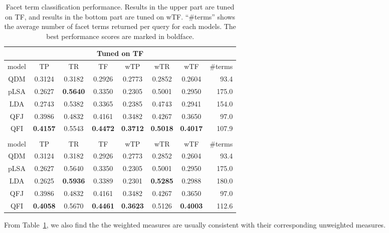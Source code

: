 \begin{table}[ht!]
\centering
\caption{Facet term classification performance. Results in the upper part are tuned on TF, and results in the bottom part are tuned on wTF. ``\#terms'' shows the average number of facet terms returned per query for each models. The best performance scores are marked in boldface.}
\label{tab:intrinsic-tf}
\begin{tabular}{|c|c|c|c|c|c|c|r|} \hline
\multicolumn{8}{|c|}{Tuned on TF} \\\hline
model& TP & TR & TF & wTP & wTR & wTF & \#terms \\ \hline
QDM & 0.3124 & 0.3182 & 0.2926 & 0.2773 & 0.2852 & 0.2604 & 93.4 \\\hline
pLSA & 0.2627 & \textbf{0.5640} & 0.3350 & 0.2305 & 0.5001 & 0.2950 & 175.0 \\ \hline
LDA & 0.2743 & 0.5382 & 0.3365 & 0.2385 & 0.4743 & 0.2941 & 154.0 \\ \hline
QFJ & 0.3986 & 0.4832 & 0.4161 & 0.3482 & 0.4267 & 0.3650 & 97.0 \\ \hline
QFI & \textbf{0.4157} & 0.5543 & \textbf{0.4472} & \textbf{0.3712} & \textbf{0.5018} & \textbf{0.4017} & 107.9 \\ 
\hhline{|========|}
\multicolumn{8}{|c|}{Tuned on wTF} \\\hline
model& TP & TR & TF & wTP & wTR & wTF & \#terms \\ \hline
QDM & 0.3124 & 0.3182 & 0.2926 & 0.2773 & 0.2852 & 0.2604 & 93.4 \\ \hline
pLSA & 0.2627 & 0.5640 & 0.3350 & 0.2305 & 0.5001 & 0.2950 & 175.0 \\ \hline
LDA & 0.2625 & \textbf{0.5936} & 0.3389 & 0.2301 & \textbf{0.5285} & 0.2988 & 180.0 \\ \hline
QFJ & 0.3986 & 0.4832 & 0.4161 & 0.3482 & 0.4267 & 0.3650 & 97.0 \\ \hline
QFI & \textbf{0.4058} & 0.5670 & \textbf{0.4461} & \textbf{0.3623} & 0.5126 & \textbf{0.4003} & 112.6 \\ \hline
\end{tabular}
\end{table}

From Table~\ref{tab:intrinsic-tf}, we also find the the weighted measures are usually consistent with their corresponding unweighted measures.

